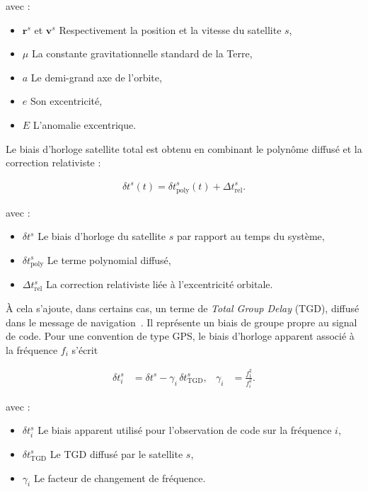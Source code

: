 avec :
\begin{itemize}
    \item $\mathbf r^s$ et $\mathbf v^s$ Respectivement la position et la
    vitesse du satellite $s$,
    \item $\mu$  La constante gravitationnelle standard de la Terre,
    \item $a$ Le demi-grand axe de l'orbite,
    \item $e$ Son excentricité,
    \item $E$ L'anomalie excentrique.
\end{itemize}

Le biais d'horloge satellite total est obtenu en combinant le polynôme
diffusé et la correction relativiste :

\begin{align}
\delta t^s(t) = \delta t_{\mathrm{poly}}^s(t)
+ \Delta t_{\mathrm{rel}}^s.
\label{eq:broadcast_satellite_clock}
\end{align}

avec :

\begin{itemize}
    \item $\delta t^s$ Le biais d'horloge du satellite $s$ par rapport au
    temps du système,
    \item $\delta t_{\mathrm{poly}}^s$ Le terme polynomial diffusé,
    \item $\Delta t_{\mathrm{rel}}^s$ La correction relativiste liée à
    l'excentricité orbitale.
\end{itemize}

À cela s'ajoute, dans certains cas, un terme de \textit{Total Group Delay}
(TGD), diffusé dans le message de navigation~\cite{isgps200n}. Il représente un biais de groupe propre au signal de code. Pour une
convention de type GPS, le biais d'horloge apparent associé à la fréquence
$f_i$ s'écrit

\begin{align}
\delta t_i^s
&=
\delta t^s-\gamma_i\,\delta t_{\mathrm{TGD}}^s,
&
\gamma_i
&=
\frac{f_1^2}{f_i^2}.
\label{eq:tgd_signal_clock}
\end{align}

avec :

\begin{itemize}
    \item $\delta t_i^s$ Le biais apparent utilisé pour l'observation de code
    sur la fréquence $i$,
    \item $\delta t_{\mathrm{TGD}}^s$ Le TGD diffusé par le satellite $s$,
    \item $\gamma_i$ Le facteur de changement de fréquence.
\end{itemize}

